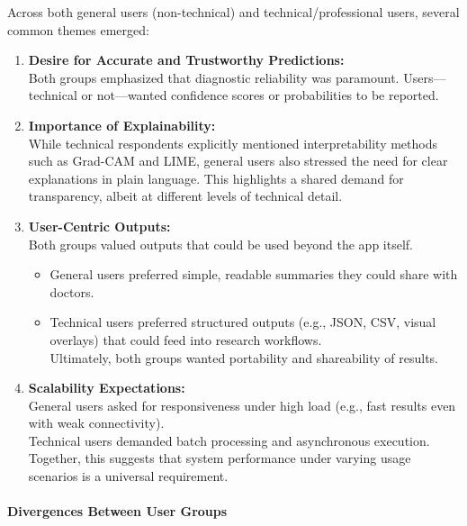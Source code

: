 \documentclass[
  12pt,
  oneside]{article}
\providecommand{\tightlist}{%
  \setlength{\itemsep}{0pt}\setlength{\parskip}{0pt}}
\begin{document}
Across both general users (non-technical) and technical/professional
users, several common themes emerged:

\begin{enumerate}
\def\labelenumi{\arabic{enumi}.}
\item
  \textbf{Desire for Accurate and Trustworthy Predictions:}\\
  Both groups emphasized that diagnostic reliability was paramount.
  Users---technical or not---wanted confidence scores or probabilities
  to be reported.
\item
  \textbf{Importance of Explainability:}\\
  While technical respondents explicitly mentioned interpretability
  methods such as Grad-CAM and LIME, general users also stressed the
  need for clear explanations in plain language. This highlights a
  shared demand for transparency, albeit at different levels of
  technical detail.
\item
  \textbf{User-Centric Outputs:}\\
  Both groups valued outputs that could be used beyond the app itself.

  \begin{itemize}
  \tightlist
  \item
    General users preferred simple, readable summaries they could share
    with doctors.\\
  \item
    Technical users preferred structured outputs (e.g., JSON, CSV,
    visual overlays) that could feed into research workflows.\\
    Ultimately, both groups wanted portability and shareability of
    results.
  \end{itemize}
\item
  \textbf{Scalability Expectations:}\\
  General users asked for responsiveness under high load (e.g., fast
  results even with weak connectivity).\\
  Technical users demanded batch processing and asynchronous
  execution.\\
  Together, this suggests that system performance under varying usage
  scenarios is a universal requirement.
\end{enumerate}

\paragraph{Divergences Between User
Groups}\label{divergences-between-user-groups}
\end{document}
